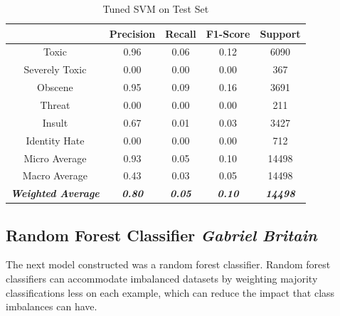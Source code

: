 \documentclass{article}
\begin{document}
{{	  \begin{table}[h!]
		  \centering
		  \begin{tabular}{|c|| c c c c|}
			  \hline
			                                     & Precision              & Recall                 & F1-Score               & Support                 \\ [0.5ex]
			  \hline\hline
			  Toxic                              & 0.96                   & 0.06                   & 0.12                   & 6090                    \\
			  Severely Toxic                     & 0.00                   & 0.00                   & 0.00                   & 367                     \\
			  Obscene                            & 0.95                   & 0.09                   & 0.16                   & 3691                    \\
			  Threat                             & 0.00                   & 0.00                   & 0.00                   & 211                     \\
			  Insult                             & 0.67                   & 0.01                   & 0.03                   & 3427                    \\
			  Identity Hate                      & 0.00                   & 0.00                   & 0.00                   & 712                     \\
			  \hline\hline
			  Micro Average                      & 0.93                   & 0.05                   & 0.10                   & 14498                   \\
			  Macro Average                      & 0.43                   & 0.03                   & 0.05                   & 14498                   \\
			  \textit{\textbf{Weighted Average}} & \textit{\textbf{0.80}} & \textit{\textbf{0.05}} & \textit{\textbf{0.10}} & \textit{\textbf{14498}} \\

			  \hline
		  \end{tabular}
		  \caption{Tuned SVM on Test Set}
		  \label{table:svm-test}
	  \end{table}
  }
  \subsection{Random Forest Classifier \textit{Gabriel Britain}}{
	  The next model constructed was a random forest classifier. Random forest
	  classifiers can accommodate imbalanced datasets by weighting majority
	  classifications less on each example, which can reduce the impact that class
	  imbalances can have.

}}
\end{document}
